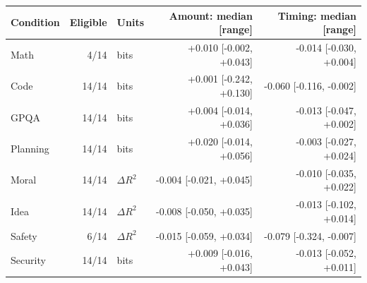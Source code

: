 \begin{tabular}{lrlrr}
\toprule Condition & Eligible & Units & Amount: median [range] & Timing: median [range] \\
\midrule
Math & 4/14 & bits & +0.010 [-0.002, +0.043] & -0.014 [-0.030, +0.004] \\
Code & 14/14 & bits & +0.001 [-0.242, +0.130] & -0.060 [-0.116, -0.002] \\
GPQA & 14/14 & bits & +0.004 [-0.014, +0.036] & -0.013 [-0.047, +0.002] \\
Planning & 14/14 & bits & +0.020 [-0.014, +0.056] & -0.003 [-0.027, +0.024] \\
Moral & 14/14 & $\Delta R^2$ & -0.004 [-0.021, +0.045] & -0.010 [-0.035, +0.022] \\
Idea & 14/14 & $\Delta R^2$ & -0.008 [-0.050, +0.035] & -0.013 [-0.102, +0.014] \\
Safety & 6/14 & $\Delta R^2$ & -0.015 [-0.059, +0.034] & -0.079 [-0.324, -0.007] \\
Security & 14/14 & bits & +0.009 [-0.016, +0.043] & -0.013 [-0.052, +0.011] \\
\bottomrule
\end{tabular}
